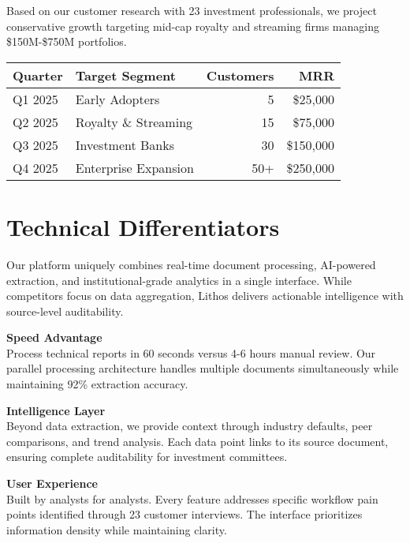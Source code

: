 \documentclass[11pt]{article}
\begin{document}
Based on our customer research with 23 investment professionals, we project conservative growth targeting mid-cap royalty and streaming firms managing \$150M-\$750M portfolios.

\begin{center}
\begin{tabularx}{\textwidth}{l X r r}
\toprule
\textbf{Quarter} & \textbf{Target Segment} & \textbf{Customers} & \textbf{MRR} \\
\midrule
Q1 2025 & Early Adopters & 5 & \$25,000 \\
Q2 2025 & Royalty \& Streaming & 15 & \$75,000 \\
Q3 2025 & Investment Banks & 30 & \$150,000 \\
Q4 2025 & Enterprise Expansion & 50+ & \$250,000 \\
\bottomrule
\end{tabularx}
\end{center}

\section{Technical Differentiators}

\begin{highlight}
Our platform uniquely combines real-time document processing, AI-powered extraction, and institutional-grade analytics in a single interface. While competitors focus on data aggregation, Lithos delivers actionable intelligence with source-level auditability.
\end{highlight}

\textbf{Speed Advantage}\\
Process technical reports in 60 seconds versus 4-6 hours manual review. Our parallel processing architecture handles multiple documents simultaneously while maintaining 92\% extraction accuracy.

\textbf{Intelligence Layer}\\
Beyond data extraction, we provide context through industry defaults, peer comparisons, and trend analysis. Each data point links to its source document, ensuring complete auditability for investment committees.

\textbf{User Experience}\\
Built by analysts for analysts. Every feature addresses specific workflow pain points identified through 23 customer interviews. The interface prioritizes information density while maintaining clarity.
\end{document}
